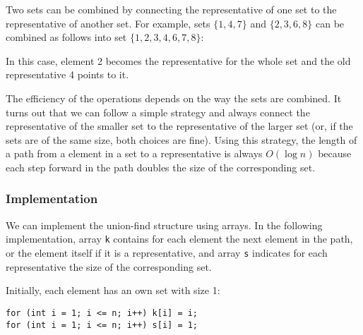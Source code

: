 Two sets can be combined by connecting the
representative of one set to the
representative of another set.
For example, sets
$\{1,4,7\}$ and $\{2,3,6,8\}$
can be combined as follows into set $\{1,2,3,4,6,7,8\}$:
\begin{center}
\end{center}

In this case, element 2 becomes the representative
for the whole set and the old representative 4
points to it.

The efficiency of the operations depends on
the way the sets are combined.
It turns out that we can follow a simple strategy
and always connect the representative of the
smaller set to the representative of the larger set
(or, if the sets are of the same size,
both choices are fine).
Using this strategy, the length of a path from
a element in a set to a representative is
always $O(\log n)$ because each step forward
in the path doubles the size of the corresponding set.

\subsubsection{Implementation}

We can implement the union-find structure
using arrays.
In the following implementation,
array \texttt{k} contains for each element
the next element
in the path, or the element itself if it is
a representative,
and array \texttt{s} indicates for each representative
the size of the corresponding set.

Initially, each element has an own set with size 1:
\begin{lstlisting}
for (int i = 1; i <= n; i++) k[i] = i;
for (int i = 1; i <= n; i++) s[i] = 1;
\end{lstlisting}

